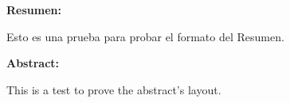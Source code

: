 \newpage


{\bfseries \large Resumen:} \vspace{5mm}


Esto es una prueba para probar el formato del Resumen.
\vspace{1cm}

\begin{otherlanguage}{english}
{\bfseries \large Abstract: }\vspace{5mm}


This is a test to prove the abstract's layout.
\vspace{1cm}
\end{otherlanguage}


\newpage